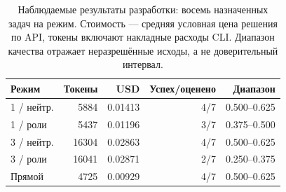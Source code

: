 \begin{table}[htbp]
\centering\small
\caption{Наблюдаемые результаты разработки: восемь назначенных задач на режим. Стоимость --- средняя условная цена решения по API, токены включают накладные расходы CLI. Диапазон качества отражает неразрешённые исходы, а не доверительный интервал.}
\label{tab:codexpilot}
\begin{tabular}{lrrrr}
\toprule
Режим & Токены & USD & Успех/оценено & Диапазон \\
\midrule
1 / нейтр. & 5884 & 0.01413 & 4/7 & 0.500--0.625 \\
1 / роли & 5437 & 0.01196 & 3/7 & 0.375--0.500 \\
3 / нейтр. & 16304 & 0.02863 & 4/7 & 0.500--0.625 \\
3 / роли & 16041 & 0.02871 & 2/7 & 0.250--0.375 \\
Прямой & 4725 & 0.00929 & 4/7 & 0.500--0.625 \\
\bottomrule
\end{tabular}
\end{table}
